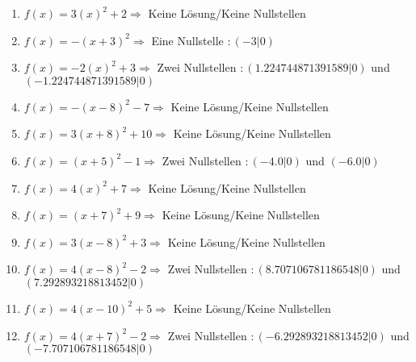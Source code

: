 \documentclass{article}%
\begin{document}
\begin{enumerate}[label=\alph*)]
\item%
\newline\vspace{0.5cm}$f(x)=3(x)^2 +2 \Rightarrow  $ Keine Lösung/Keine Nullstellen $ $%
\item%
\newline\vspace{0.5cm}$f(x)=-(x+3)^2 \Rightarrow $ Eine Nullstelle $: (-3|0) $%
\item%
\newline\vspace{0.5cm}$f(x)=-2(x)^2 +3 \Rightarrow $ Zwei Nullstellen $: (1.224744871391589|0) $ und $ (-1.224744871391589|0) $%
\item%
\newline\vspace{0.5cm}$f(x)=-(x-8)^2 -7 \Rightarrow  $ Keine Lösung/Keine Nullstellen $ $%
\item%
\newline\vspace{0.5cm}$f(x)=3(x+8)^2 +10 \Rightarrow  $ Keine Lösung/Keine Nullstellen $ $%
\item%
\newline\vspace{0.5cm}$f(x)=(x+5)^2 -1 \Rightarrow $ Zwei Nullstellen $: (-4.0|0) $ und $ (-6.0|0) $%
\item%
\newline\vspace{0.5cm}$f(x)=4(x)^2 +7 \Rightarrow  $ Keine Lösung/Keine Nullstellen $ $%
\item%
\newline\vspace{0.5cm}$f(x)=(x+7)^2 +9 \Rightarrow  $ Keine Lösung/Keine Nullstellen $ $%
\item%
\newline\vspace{0.5cm}$f(x)=3(x-8)^2 +3 \Rightarrow  $ Keine Lösung/Keine Nullstellen $ $%
\item%
\newline\vspace{0.5cm}$f(x)=4(x-8)^2 -2 \Rightarrow $ Zwei Nullstellen $: (8.707106781186548|0) $ und $ (7.292893218813452|0) $%
\item%
\newline\vspace{0.5cm}$f(x)=4(x-10)^2 +5 \Rightarrow  $ Keine Lösung/Keine Nullstellen $ $%
\item%
\newline\vspace{0.5cm}$f(x)=4(x+7)^2 -2 \Rightarrow $ Zwei Nullstellen $: (-6.292893218813452|0) $ und $ (-7.707106781186548|0) $%

\end{enumerate}
\end{document}
